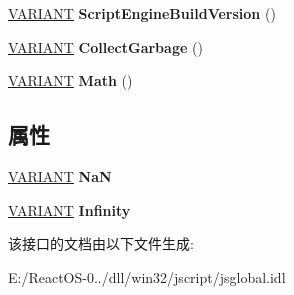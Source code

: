 \begin{DoxyCompactItemize}
\mbox{\label{interface_j_s_global_1_1_global_obj_a58aeed4347a347e96a36ff1581b82c5a}} 
\hyperlink{structtag_v_a_r_i_a_n_t}{V\+A\+R\+I\+A\+NT} {\bfseries Script\+Engine\+Build\+Version} ()
\item 
\mbox{\label{interface_j_s_global_1_1_global_obj_ad6e448c3ef8c96845612241bcc6ede17}} 
\hyperlink{structtag_v_a_r_i_a_n_t}{V\+A\+R\+I\+A\+NT} {\bfseries Collect\+Garbage} ()
\item 
\mbox{\label{interface_j_s_global_1_1_global_obj_a73586e6043121137bf2a54883b6be0d4}} 
\hyperlink{structtag_v_a_r_i_a_n_t}{V\+A\+R\+I\+A\+NT} {\bfseries Math} ()
\end{DoxyCompactItemize}
\subsection*{属性}
\begin{DoxyCompactItemize}
\item 
\mbox{\label{interface_j_s_global_1_1_global_obj_af8d416f07a8658b6e6b2da3d136ddfd2}} 
\hyperlink{structtag_v_a_r_i_a_n_t}{V\+A\+R\+I\+A\+NT} {\bfseries NaN}
\item 
\mbox{\label{interface_j_s_global_1_1_global_obj_a84c1d9436ffa253703595ee28327d1ac}} 
\hyperlink{structtag_v_a_r_i_a_n_t}{V\+A\+R\+I\+A\+NT} {\bfseries Infinity}
\end{DoxyCompactItemize}


该接口的文档由以下文件生成\+:\begin{DoxyCompactItemize}
\item 
E\+:/\+React\+O\+S-\/0../dll/win32/jscript/jsglobal.\+idl\end{DoxyCompactItemize}
